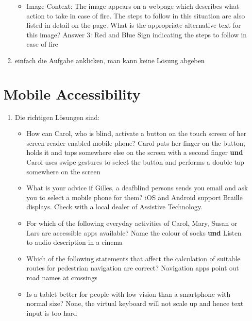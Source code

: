 \documentclass{article}
\begin{document}
\begin{enumerate}[label=(\alph*)]
\begin{itemize}
			\item Image Context: The image appears on a webpage which describes what action to take in case of fire. The steps to follow in this situation are also listed in detail on the page. What is the appropriate alternative text for this image? \textcolor{green!90!black}{Answer 3: Red and Blue Sign indicating the steps to follow in case of fire}
		\end{itemize}
		\item einfach die Aufgabe anklicken, man kann keine Lösung abgeben
	\end{enumerate}
	
	\section*{Mobile Accessibility}
	\begin{enumerate}[label=(\alph*)]
		\item Die richtigen Lösungen sind:
		\begin{itemize}
			\item How can Carol, who is blind, activate a button on the touch screen of her screen-reader enabled mobile phone? \textcolor{green!90!black}{Carol puts her finger on the button, holds it and taps somewhere else on the screen with a second finger} \textbf{und} \textcolor{green!90!black}{Carol uses swipe gestures to select the button and performs a double tap somewhere on the screen}
			\item What is your advice if Gilles, a deafblind persons sends you email and ask you to select a mobile phone for them? \textcolor{green!90!black}{iOS and Android support Braille displays. Check with a local dealer of Assistive  Technology.}
			\item For which of the following everyday activities of Carol, Mary, Susan or Lars are accessible apps available? \textcolor{green!90!black}{Name the colour of socks} \textbf{und} \textcolor{green!90!black}{Listen to audio description in a cinema}
			\item Which of the following statements that affect the calculation of suitable routes for pedestrian navigation are correct? \textcolor{green!90!black}{Navigation apps point out road names at crossings}
			\item Is a tablet better for people with low vision than a smartphone with normal size? \textcolor{green!90!black}{None, the virtual keyboard will not scale up and hence text input is too hard}
		\end{itemize}
	\end{enumerate}
\end{document}
